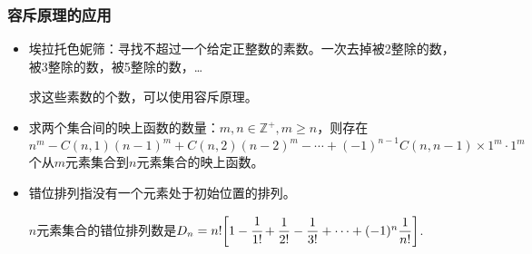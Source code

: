 \subsubsection*{容斥原理的应用}
\begin{itemize}
    \item 埃拉托色妮筛：寻找不超过一个给定正整数的素数。一次去掉被2整除的数，被3整除的数，被5整除的数，\ldots

    求这些素数的个数，可以使用容斥原理。

    \item 求两个集合间的映上函数的数量：$m, n \in \mathbb Z^+ ,m \ge n$，则存在$n^m - C(n ,1)(n-1)^m + C(n,2)(n-2)^m - \cdots + (-1)^{n-1} C(n, n-1) \times 1^m \cdot 1^m$个从$m$元素集合到$n$元素集合的映上函数。

    \item 错位排列指没有一个元素处于初始位置的排列。

    $n$元素集合的错位排列数是$D_n = n! \bigg[ 1- \cfrac 1{1!} + \dfrac 1{2!} - \dfrac 1{3!} + \cdots + (-1)^n \dfrac 1{n!} \bigg]$.
\end{itemize}